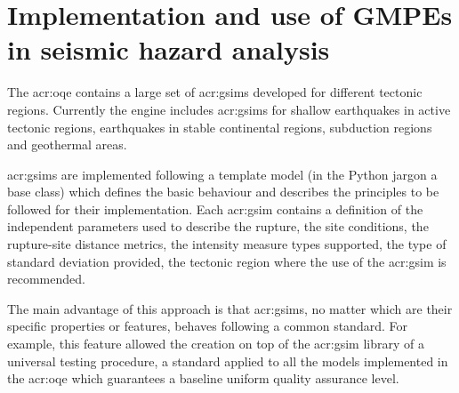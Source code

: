 %
\section{Implementation and use of GMPEs in seismic hazard analysis}
The \gls{acr:oqe} contains a large set of \glspl{acr:gsim}
developed for different tectonic regions. 
%
Currently the engine includes \glspl{acr:gsim} for shallow earthquakes
in active tectonic regions, earthquakes in stable continental regions,
subduction regions and geothermal areas.

\glspl{acr:gsim} are implemented following a template model (in the 
Python jargon a base class) which defines the basic behaviour and 
describes the principles to be followed for their implementation.
%
Each \gls{acr:gsim} contains a definition of the independent parameters
used to describe the rupture, the site conditions, the rupture-site
distance metrics, the intensity measure types supported, the type of 
standard deviation provided, the tectonic region where the use of the 
\gls{acr:gsim} is recommended.

The main advantage of this approach is that \glspl{acr:gsim}, no matter 
which are their specific properties or features, behaves following 
a common standard. 
%
For example, this feature allowed the creation on top of the 
\gls{acr:gsim} library of a universal testing procedure, a standard 
applied to all the models implemented in the \gls{acr:oqe} which 
guarantees a baseline uniform quality assurance level. 

